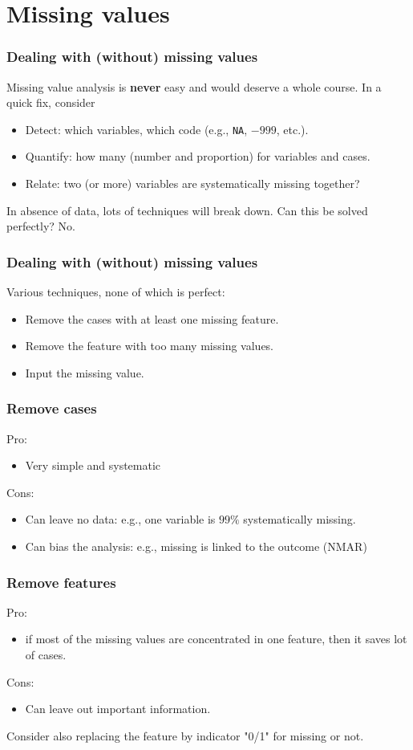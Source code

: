 \section{Missing values}
\begin{frame}
\frametitle{Dealing with (without) missing values}
Missing value analysis is {\bf never} easy and would deserve a whole course. In a quick fix, consider
\begin{itemize}
\item Detect: which variables, which code (e.g., {\tt NA}, $-999$, etc.).  
\item Quantify: how many (number and proportion) for variables and cases.
\item Relate: two (or more) variables are systematically missing together?
\end{itemize}
In absence of data, lots of techniques will break down. Can this be solved perfectly? No.
\end{frame}
\begin{frame}
\frametitle{Dealing with (without) missing values}
Various techniques, none of which is perfect:
\begin{itemize}
\item Remove the cases with at least one missing feature.
\item Remove the feature with too many missing values.
\item Input the missing value.
\end{itemize}
\end{frame}
\begin{frame}
\frametitle{Remove cases}
Pro:
\begin{itemize}
\item Very simple and systematic
\end{itemize}
Cons:
\begin{itemize}
\item Can leave no data: e.g., one variable is $99\%$ systematically missing.
\item Can bias the analysis: e.g., missing is linked to the outcome (NMAR)
\end{itemize}
\end{frame}
\begin{frame}
\frametitle{Remove features}
Pro:
\begin{itemize}
\item if most of the missing values are concentrated in one feature, then it saves lot of cases.
\end{itemize}
Cons:
\begin{itemize}
\item Can leave out important information.
\end{itemize}
Consider also replacing the feature by indicator "0/1" for missing or not. 
\end{frame}
